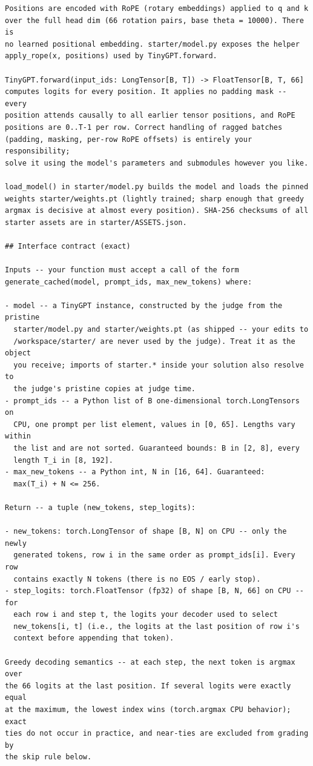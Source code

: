 \documentclass[11pt]{article}
\begin{document}
\begin{lstlisting}[style=plain]
Positions are encoded with RoPE (rotary embeddings) applied to q and k
over the full head dim (66 rotation pairs, base theta = 10000). There is
no learned positional embedding. starter/model.py exposes the helper
apply_rope(x, positions) used by TinyGPT.forward.

TinyGPT.forward(input_ids: LongTensor[B, T]) -> FloatTensor[B, T, 66]
computes logits for every position. It applies no padding mask -- every
position attends causally to all earlier tensor positions, and RoPE
positions are 0..T-1 per row. Correct handling of ragged batches
(padding, masking, per-row RoPE offsets) is entirely your responsibility;
solve it using the model's parameters and submodules however you like.

load_model() in starter/model.py builds the model and loads the pinned
weights starter/weights.pt (lightly trained; sharp enough that greedy
argmax is decisive at almost every position). SHA-256 checksums of all
starter assets are in starter/ASSETS.json.

## Interface contract (exact)

Inputs -- your function must accept a call of the form
generate_cached(model, prompt_ids, max_new_tokens) where:

- model -- a TinyGPT instance, constructed by the judge from the pristine
  starter/model.py and starter/weights.pt (as shipped -- your edits to
  /workspace/starter/ are never used by the judge). Treat it as the object
  you receive; imports of starter.* inside your solution also resolve to
  the judge's pristine copies at judge time.
- prompt_ids -- a Python list of B one-dimensional torch.LongTensors on
  CPU, one prompt per list element, values in [0, 65]. Lengths vary within
  the list and are not sorted. Guaranteed bounds: B in [2, 8], every
  length T_i in [8, 192].
- max_new_tokens -- a Python int, N in [16, 64]. Guaranteed:
  max(T_i) + N <= 256.

Return -- a tuple (new_tokens, step_logits):

- new_tokens: torch.LongTensor of shape [B, N] on CPU -- only the newly
  generated tokens, row i in the same order as prompt_ids[i]. Every row
  contains exactly N tokens (there is no EOS / early stop).
- step_logits: torch.FloatTensor (fp32) of shape [B, N, 66] on CPU -- for
  each row i and step t, the logits your decoder used to select
  new_tokens[i, t] (i.e., the logits at the last position of row i's
  context before appending that token).

Greedy decoding semantics -- at each step, the next token is argmax over
the 66 logits at the last position. If several logits were exactly equal
at the maximum, the lowest index wins (torch.argmax CPU behavior); exact
ties do not occur in practice, and near-ties are excluded from grading by
the skip rule below.


\end{lstlisting}
\end{document}
